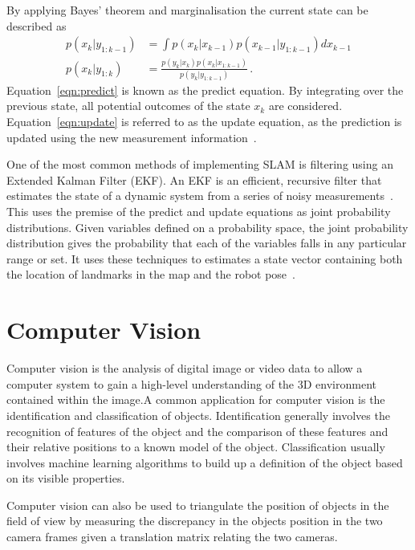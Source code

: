 By applying Bayes' theorem and marginalisation the current state can be described as
\begin{align}
\label{eqn:predict}
p(x_{k} | y_{1:k-1}) & = \int p(x_{k}|x_{k-1}) p(x_{k-1} | y_{1:k-1}) dx_{k-1} \\
\label{eqn:update}
p(x_{k} | y_{1:k}) &= \frac{ p(y_{k}|x_{k})p(x_{k}|x_{1:k-1})}{ p(y_{k}|y_{1:k-1})}\,.
\end{align}
Equation~\ref{eqn:predict} is known as the predict equation. By integrating over
the previous state, all potential outcomes of the state $x_k$ are
considered. Equation~\ref{eqn:update} is referred to as the update equation,
as the prediction is updated using the new measurement information~\cite{kam1997sensorfusion}.

One of the most common methods of implementing SLAM is filtering using an
Extended Kalman Filter (EKF). An EKF is an efficient, recursive filter
that estimates the state of a dynamic system from a series of noisy measurements~\cite{fox2003bayesian}.
This uses the premise of the predict and update equations as joint probability
distributions. Given variables defined on a probability space, the joint
probability distribution gives the probability that each of the variables falls in any
particular range or set. It uses these techniques to estimates a state vector containing
both the location of landmarks in the map and the robot pose~\cite{huang2007convergence}.


\section{Computer Vision}\label{litreview/cv}
Computer vision is the analysis of digital image or video data to allow a computer
system to gain a high-level understanding of the 3D environment contained within
the image\cite{CVBallard}.A common application for computer vision is the identification and classification
of objects. Identification generally involves the recognition of features of the
object and the comparison of these features and their relative positions to a
known model of the object. Classification usually involves machine learning
algorithms to build up a definition of the object based on its visible properties\cite{CVpaoletti2018new}.

Computer vision can also be used to triangulate the position of objects in the
field of view by measuring the discrepancy in the objects position in the two camera
frames given a translation matrix relating the two cameras.


